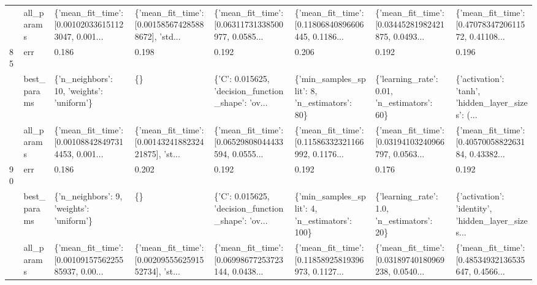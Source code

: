 \begin{tabular}{llllllll}
    & all\_params &  \{'mean\_fit\_time': [0.001020336151123047, 0.001... &  \{'mean\_fit\_time': [0.001585674285888672], 'std... &  \{'mean\_fit\_time': [0.06311731338500977, 0.0585... &  \{'mean\_fit\_time': [0.11806840896606445, 0.1186... &  \{'mean\_fit\_time': [0.03445281982421875, 0.0493... &  \{'mean\_fit\_time': [0.4707834720611572, 0.41108... \\
85  & err &                                              0.186 &                                              0.198 &                                              0.192 &                                              0.206 &                                              0.192 &                                              0.196 \\
    & best\_params &          \{'n\_neighbors': 10, 'weights': 'uniform'\} &                                                 \{\} &  \{'C': 0.015625, 'decision\_function\_shape': 'ov... &       \{'min\_samples\_split': 8, 'n\_estimators': 80\} &        \{'learning\_rate': 0.01, 'n\_estimators': 60\} &  \{'activation': 'tanh', 'hidden\_layer\_sizes': (... \\
    & all\_params &  \{'mean\_fit\_time': [0.001088428497314453, 0.001... &  \{'mean\_fit\_time': [0.0014324188232421875], 'st... &  \{'mean\_fit\_time': [0.06529808044433594, 0.0555... &  \{'mean\_fit\_time': [0.11586332321166992, 0.1176... &  \{'mean\_fit\_time': [0.03194103240966797, 0.0563... &  \{'mean\_fit\_time': [0.4057005882263184, 0.43382... \\
90  & err &                                              0.186 &                                              0.202 &                                              0.192 &                                              0.192 &                                              0.176 &                                              0.192 \\
    & best\_params &           \{'n\_neighbors': 9, 'weights': 'uniform'\} &                                                 \{\} &  \{'C': 0.015625, 'decision\_function\_shape': 'ov... &      \{'min\_samples\_split': 4, 'n\_estimators': 100\} &         \{'learning\_rate': 1.0, 'n\_estimators': 20\} &  \{'activation': 'identity', 'hidden\_layer\_sizes... \\
    & all\_params &  \{'mean\_fit\_time': [0.0010915756225585937, 0.00... &  \{'mean\_fit\_time': [0.0020955562591552734], 'st... &  \{'mean\_fit\_time': [0.06998677253723144, 0.0438... &  \{'mean\_fit\_time': [0.11858925819396973, 0.1127... &  \{'mean\_fit\_time': [0.03189740180969238, 0.0540... &  \{'mean\_fit\_time': [0.48534932136535647, 0.4566... \\

\end{tabular}
